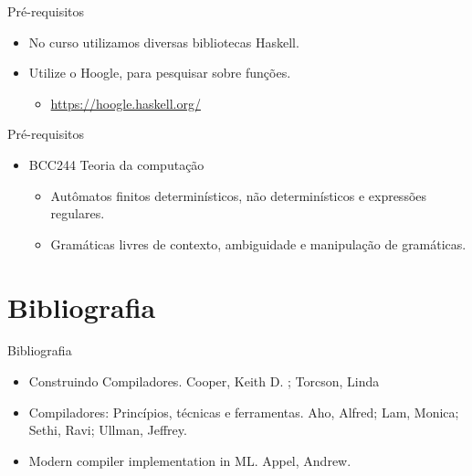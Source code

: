 \begin{frame}{Pré-requisitos}

    \begin{itemize}
        \item
        No curso utilizamos diversas bibliotecas Haskell.
        \item
        Utilize o Hoogle, para pesquisar sobre funções.

        \begin{itemize}

            \item
            \url{https://hoogle.haskell.org/}
        \end{itemize}
    \end{itemize}
\end{frame}

\begin{frame}{Pré-requisitos}

    \begin{itemize}

        \item
        BCC244 Teoria da computação

        \begin{itemize}

            \item
            Autômatos finitos determinísticos, não determinísticos e expressões
            regulares.
            \item
            Gramáticas livres de contexto, ambiguidade e manipulação de
            gramáticas.
        \end{itemize}
    \end{itemize}
\end{frame}


\section{Bibliografia}\label{bibliografia}

\begin{frame}{Bibliografia}

    \begin{itemize}
        \item
        Construindo Compiladores. Cooper, Keith D. ; Torcson, Linda
        \item
        Compiladores: Princípios, técnicas e ferramentas. Aho, Alfred; Lam,
        Monica; Sethi, Ravi; Ullman, Jeffrey.
        \item
        Modern compiler implementation in ML. Appel, Andrew.
    \end{itemize}
\end{frame}


